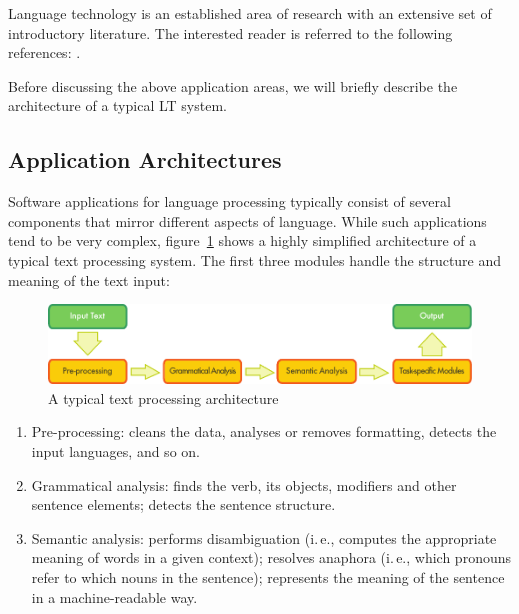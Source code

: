 \begin{multicols}{2}
Language technology is an established area of research with an extensive set of introductory literature. The interested reader is referred to the following references:  \cite{carstensen-etal1, jurafsky-martin01, manning-schuetze1, lt-world1, lt-survey1}.

Before discussing the above application areas, we will briefly describe the architecture of a typical LT system.

\subsection{Application Architectures}

Software applications for language processing typically consist of several components that mirror different aspects of language. While such applications tend to be very complex, figure~\ref{fig:textprocessingarch_en} shows a highly simplified architecture of a typical text processing system. The first three modules handle the structure and meaning of the text input:

\begin{figure}[hb]
  \center
  \includegraphics[width=\textwidth]{../_media/english/text_processing_app_architecture}
  \caption{A typical text processing architecture}
\label{fig:textprocessingarch_en}
\end{figure}

\begin{enumerate}
\item Pre-processing: cleans the data, analyses or removes formatting, detects the input languages, and so on.
\item Grammatical analysis: finds the verb, its objects, modifiers and other sentence elements; detects the sentence structure.
\item Semantic analysis: performs disambiguation (i.\,e., computes the appropriate meaning of words in a given context); resolves anaphora (i.\,e., which pronouns refer to which nouns in the sentence); represents the meaning of the sentence in a machine-readable way.
\end{enumerate}


\end{multicols}
